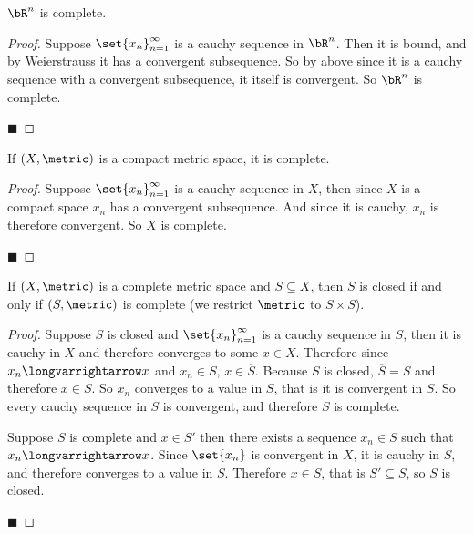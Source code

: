 \documentclass[10pt]{article}
\begin{document}
\begin{prop*}

    $\bR^n$ is complete.

\end{prop*}

\begin{proof}

    Suppose $\set{x_n}_{n=1}^\infty$ is a cauchy sequence in $\bR^n$.
    Then it is bound, and by Weierstrauss it has a convergent subsequence.
    So by above since it is a cauchy sequence with a convergent subsequence, it itself is convergent.
    So $\bR^n$ is complete.

    \hfill$\blacksquare$

\end{proof}

\begin{prop*}

    If $(X,\metric)$ is a compact metric space, it is complete.

\end{prop*}

\begin{proof}

    Suppose $\set{x_n}_{n=1}^\infty$ is a cauchy sequence in $X$, then since $X$ is a compact space $x_n$ has a convergent subsequence.
    And since it is cauchy, $x_n$ is therefore convergent.
    So $X$ is complete.

    \hfill$\blacksquare$

\end{proof}

\begin{prop*}

    If $(X,\metric)$ is a complete metric space and $S\subseteq X$, then $S$ is closed if and only if $(S,\metric)$ is complete (we restrict $\metric$ to $S\times S$).

\end{prop*}

\begin{proof}

    Suppose $S$ is closed and $\set{x_n}_{n=1}^\infty$ is a cauchy sequence in $S$, then it is cauchy in $X$ and therefore converges to some $x\in X$.
    Therefore since $x_n\longvarrightarrow x$ and $x_n\in S$, $x\in\overline S$.
    Because $S$ is closed, $\overline S=S$ and therefore $x\in S$.
    So $x_n$ converges to a value in $S$, that is it is convergent in $S$.
    So every cauchy sequence in $S$ is convergent, and therefore $S$ is complete.

    Suppose $S$ is complete and $x\in S'$ then there exists a sequence $x_n\in S$ such that $x_n\longvarrightarrow x$.
    Since $\set{x_n}$ is convergent in $X$, it is cauchy in $S$, and therefore converges to a value in $S$.
    Therefore $x\in S$, that is $S'\subseteq S$, so $S$ is closed.

    \hfill$\blacksquare$

\end{proof}
\end{document}
